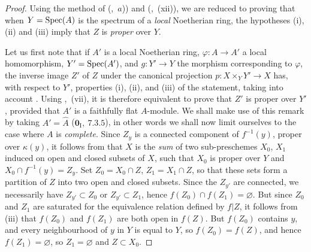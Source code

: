 \begin{proof}
Using the method of (,~$a$)) and (,~(xii)), we are reduced to proving that when $Y=\operatorname{Spec}(A)$ is the spectrum of a \emph{local} Noetherian ring, the hypotheses (i), (ii) and (iii) imply that $Z$ is \emph{proper} over $Y$.

Let us first note that if $A'$ is a local Noetherian ring, $\varphi:A\to A'$ a local homomorphism, $Y'=\operatorname{Spec}(A')$, and $g:Y'\to Y$ the morphism corresponding to $\varphi$, the inverse image $Z'$ of $Z$ under the canonical projection $p:X\times_Y Y'\to X$ has, with respect to $Y'$, properties (i), (ii), and (iii) of the statement, taking into account . Using ,~(vii), it is therefore equivalent to prove that $Z'$ is proper over $Y'$, provided that $A'$ is a faithfully flat $A$-module.
We shall make use of this remark by taking $A'=\hat{A}$ ($\mathbf{0}_{\mathrm{I}},~7.3.5$), in other words we shall now limit ourselves to the case where $A$ is \emph{complete}.
Since $Z_y$ is a connected component of $f^{-1}(y)$, proper over $\kappa(y)$, it follows from  that $X$ is the \emph{sum} of two sub-preschemes $X_0$, $X_1$ induced on open and closed subsets of $X$, such that $X_0$ is proper over $Y$ and $X_0\cap f^{-1}(y)=Z_y$.
Set $Z_0=X_0\cap Z$, $Z_1=X_1\cap Z$, so that these sets form a partition of $Z$ into two open and closed subsets.
Since the $Z_{y'}$ are connected, we necessarily have $Z_{y'}\subset Z_0$ or $Z_{y'}\subset Z_1$, hence $f(Z_0)\cap f(Z_1)=\varnothing$.
But since $Z_0$ and $Z_1$ are saturated for the equivalence relation defined by $f|Z$, it follows from (iii) that $f(Z_0)$ and $f(Z_1)$ are both open in $f(Z)$.
But $f(Z_0)$ contains $y$, and every neighbourhood of $y$ in $Y$ is equal to $Y$, so $f(Z_0)=f(Z)$, and hence $f(Z_1)=\varnothing$, so $Z_1=\varnothing$ and $Z\subset X_0$.


\end{proof}

